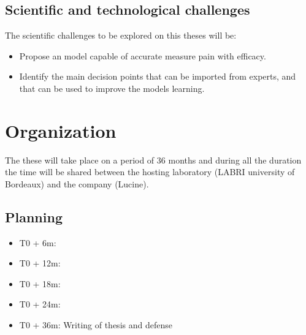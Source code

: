 \documentclass[11pt]{article}
\begin{document}
\subsection{Scientific and technological challenges}
\label{sec:org151988f}
The scientific challenges to be explored on this theses will be:
\begin{itemize}
\item Propose an model capable of accurate measure pain with efficacy.
\item Identify the main decision points that can be imported from experts, and
that can be used to improve the models learning.
\end{itemize}


\section{Organization}
\label{sec:orgbd708cc}
The these will take place on a period of 36 months and during all the duration
the time will be shared between the hosting laboratory (LABRI university of
Bordeaux) and the company (Lucine).

\subsection{Planning}
\label{sec:orgf9a9080}
\begin{itemize}
\item T0 + 6m:
\item T0 + 12m:
\item T0 + 18m:
\item T0 + 24m:
\item T0 + 36m: Writing of thesis and defense
\end{itemize}





\end{document}
